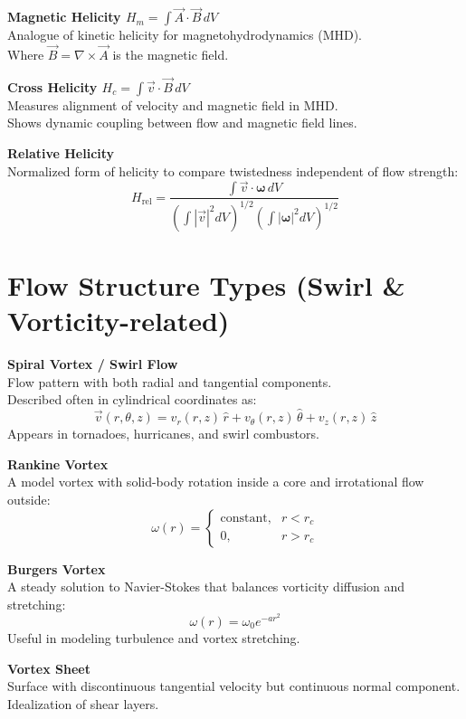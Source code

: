 \documentclass[12pt]{article}
\begin{document}
\medskip
\textbf{Magnetic Helicity \( H_m = \int \vec{A} \cdot \vec{B} \, dV \)} \\
Analogue of kinetic helicity for magnetohydrodynamics (MHD). \\
Where \( \vec{B} = \nabla \times \vec{A} \) is the magnetic field.

\medskip
\textbf{Cross Helicity \( H_c = \int \vec{v} \cdot \vec{B} \, dV \)} \\
Measures alignment of velocity and magnetic field in MHD. \\
Shows dynamic coupling between flow and magnetic field lines.

\medskip
\textbf{Relative Helicity} \\
Normalized form of helicity to compare twistedness independent of flow strength:
\[
H_{\text{rel}} = \frac{\int \vec{v} \cdot \boldsymbol{\omega} \, dV}
{\left( \int |\vec{v}|^2 dV \right)^{1/2}
\left( \int |\boldsymbol{\omega}|^2 dV \right)^{1/2}}
\]

\section*{Flow Structure Types (Swirl \& Vorticity-related)}

\textbf{Spiral Vortex / Swirl Flow} \\
Flow pattern with both radial and tangential components. \\
Described often in cylindrical coordinates as:
\[
\vec{v}(r,\theta,z) = v_r(r,z) \, \hat{r} + v_\theta(r,z) \, \hat{\theta} + v_z(r,z) \, \hat{z}
\]
Appears in tornadoes, hurricanes, and swirl combustors.

\medskip
\textbf{Rankine Vortex} \\
A model vortex with solid-body rotation inside a core and irrotational flow outside:
\[
\omega(r) =
\begin{cases}
\text{constant}, & r < r_c \\
0, & r > r_c
\end{cases}
\]

\medskip
\textbf{Burgers Vortex} \\
A steady solution to Navier-Stokes that balances vorticity diffusion and stretching:
\[
\omega(r) = \omega_0 e^{-a r^2}
\]
Useful in modeling turbulence and vortex stretching.

\medskip
\textbf{Vortex Sheet} \\
Surface with discontinuous tangential velocity but continuous normal component. \\
Idealization of shear layers.
\end{document}
